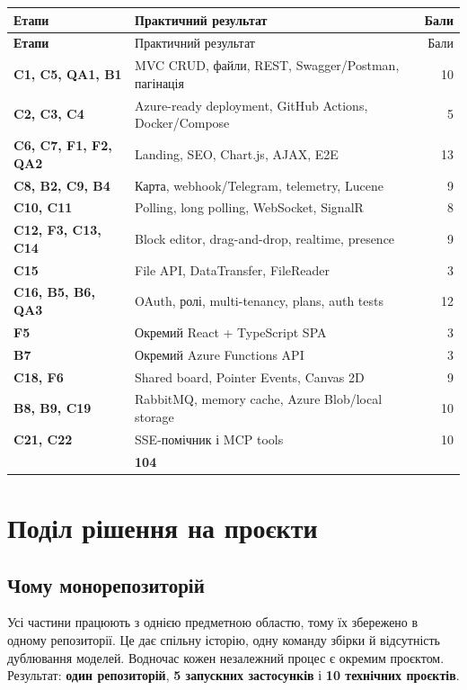 \documentclass[12pt,a4paper]{article}
\begin{document}
\begin{longtable}{>{\bfseries}p{} p{} r}
\toprule Етапи & Практичний результат & Бали \\
\midrule\endfirsthead
\toprule Етапи & Практичний результат & Бали \\
\midrule\endhead
C1, C5, QA1, B1 & MVC CRUD, файли, REST, Swagger/Postman, пагінація & 10 \\
C2, C3, C4 & Azure-ready deployment, GitHub Actions, Docker/Compose & 5 \\
C6, C7, F1, F2, QA2 & Landing, SEO, Chart.js, AJAX, E2E & 13 \\
C8, B2, C9, B4 & Карта, webhook/Telegram, telemetry, Lucene & 9 \\
C10, C11 & Polling, long polling, WebSocket, SignalR & 8 \\
C12, F3, C13, C14 & Block editor, drag-and-drop, realtime, presence & 9 \\
C15 & File API, DataTransfer, FileReader & 3 \\
C16, B5, B6, QA3 & OAuth, ролі, multi-tenancy, plans, auth tests & 12 \\
F5 & Окремий React + TypeScript SPA & 3 \\
B7 & Окремий Azure Functions API & 3 \\
C18, F6 & Shared board, Pointer Events, Canvas 2D & 9 \\
B8, B9, C19 & RabbitMQ, memory cache, Azure Blob/local storage & 10 \\
C21, C22 & SSE-помічник і MCP tools & 10 \\
\midrule \multicolumn{2}{r}{\textbf{Разом}} & \textbf{104} \\
\bottomrule
\end{longtable}

\section{Поділ рішення на проєкти}
\subsection{Чому монорепозиторій}
Усі частини працюють з однією предметною областю, тому їх збережено в одному
репозиторії. Це дає спільну історію, одну команду збірки й відсутність
дублювання моделей. Водночас кожен незалежний процес є окремим проєктом.
Результат: \textbf{один репозиторій}, \textbf{5 запускних застосунків} і
\textbf{10 технічних проєктів}.
\end{document}
